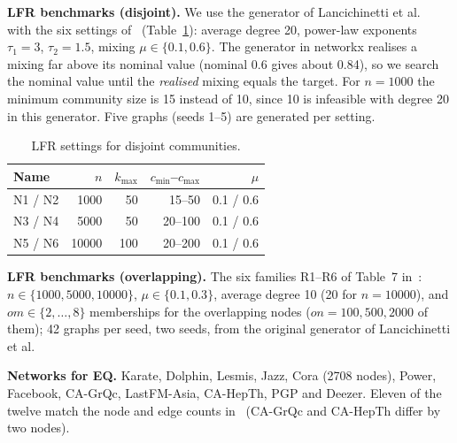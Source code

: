\documentclass[conference]{IEEEtran}
\begin{document}
\textbf{LFR benchmarks (disjoint).} We use the generator of Lancichinetti et al.~\cite{lfr2008} with the six settings of~\cite{kong2026} (Table~\ref{tab:lfrparam}): average degree 20, power-law exponents $\tau_1=3$, $\tau_2=1.5$, mixing $\mu\in\{0.1,0.6\}$. The generator in networkx realises a mixing far above its nominal value (nominal 0.6 gives about 0.84), so we search the nominal value until the \emph{realised} mixing equals the target. For $n=1000$ the minimum community size is 15 instead of 10, since 10 is infeasible with degree 20 in this generator. Five graphs (seeds 1--5) are generated per setting.
\begin{table}[!htb]
\centering
\caption{LFR settings for disjoint communities.}
\label{tab:lfrparam}
\scriptsize
\begin{tabular}{lrrrr}
\toprule
Name & $n$ & $k_{\max}$ & $c_{\min}$--$c_{\max}$ & $\mu$ \\
\midrule
N1 / N2 & 1000 & 50 & 15--50 & 0.1 / 0.6 \\
N3 / N4 & 5000 & 50 & 20--100 & 0.1 / 0.6 \\
N5 / N6 & 10000 & 100 & 20--200 & 0.1 / 0.6 \\
\bottomrule
\end{tabular}
\end{table}

\textbf{LFR benchmarks (overlapping).} The six families R1--R6 of Table~7 in~\cite{kong2026}: $n\in\{1000,5000,10000\}$, $\mu\in\{0.1,0.3\}$, average degree 10 (20 for $n=10000$), and $om\in\{2,\dots,8\}$ memberships for the overlapping nodes ($on=100,500,2000$ of them); 42 graphs per seed, two seeds, from the original generator of Lancichinetti et al.

\textbf{Networks for EQ.} Karate, Dolphin, Lesmis, Jazz, Cora (2708 nodes), Power, Facebook, CA-GrQc, LastFM-Asia, CA-HepTh, PGP and Deezer. Eleven of the twelve match the node and edge counts in~\cite{kong2026} (CA-GrQc and CA-HepTh differ by two nodes).
\end{document}
